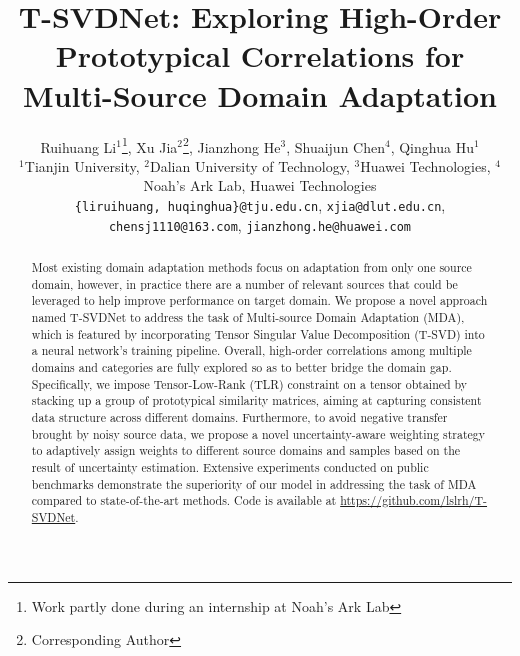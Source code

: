 \documentclass[10pt,twocolumn,letterpaper]{article}
\makeatletter
\newcommand{\printfnsymbol}[1]{\textsuperscript{\@fnsymbol{#1}}}
\makeatother
\begin{document}
\title{T-SVDNet: Exploring High-Order Prototypical Correlations for Multi-Source Domain Adaptation}
\author{Ruihuang Li$^1$\thanks{Work partly done during an internship at Noah’s Ark Lab}, Xu Jia$^2$\thanks{Corresponding Author}, Jianzhong He$^3$, Shuaijun Chen$^4$, Qinghua Hu$^1$\printfnsymbol{2}   \\ \vspace{-0.8em}
	$^1$Tianjin University, $^2$Dalian University of Technology, $^3$Huawei Technologies, $^4$Noah’s Ark Lab, Huawei Technologies \\ 
	{\tt\small \{liruihuang, huqinghua\}@tju.edu.cn}, {\tt\small xjia@dlut.edu.cn}, {\tt\small chensj1110@163.com}, {\tt\small jianzhong.he@huawei.com} }




\maketitle
\ificcvfinal\thispagestyle{empty}\fi

\begin{abstract}
	Most existing domain adaptation methods focus on adaptation from only one source domain, however, in practice there are a number of relevant sources that could be leveraged to help improve performance on target domain. We propose a novel approach named T-SVDNet to address the task of Multi-source Domain Adaptation (MDA), which is featured by incorporating Tensor Singular Value Decomposition (T-SVD) into a neural network's training pipeline. Overall, high-order correlations among multiple domains and categories are fully explored so as to better bridge the domain gap. Specifically, we impose Tensor-Low-Rank (TLR) constraint on a tensor obtained by stacking up a group of prototypical similarity matrices, aiming at capturing consistent data structure across different domains. Furthermore, to avoid negative transfer brought by noisy source data, we propose a novel uncertainty-aware weighting strategy to adaptively assign weights to different source domains and samples based on the result of uncertainty estimation. Extensive experiments conducted on public benchmarks demonstrate the superiority of our model in addressing the task of MDA compared to state-of-the-art methods. Code is available at {\small  \url{https://github.com/lslrh/T-SVDNet}}.
\end{abstract}
\end{document}
